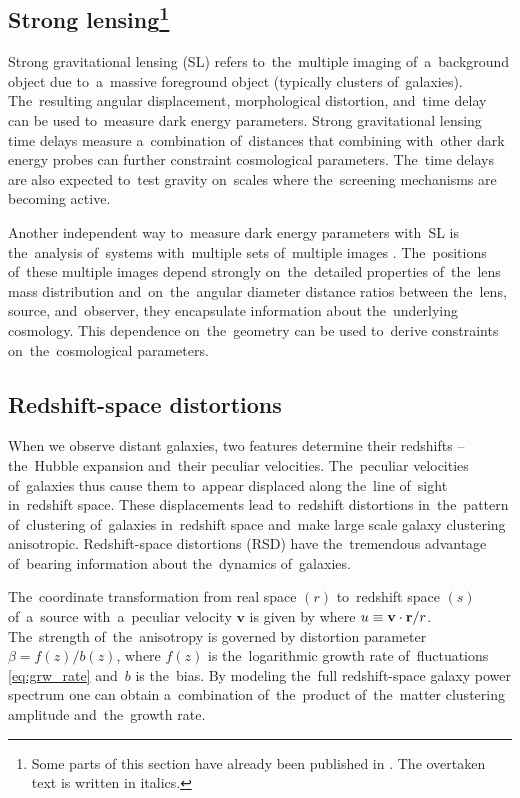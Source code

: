 \subsection[Strong lensing]{Strong lensing\footnote{\label{ftn2}Some parts of this section have already been published in \textcite{mastersthesis_vrastil}. The overtaken text is written in italics.}}
\label{ssec:SL}
Strong gravitational lensing (SL) refers to~the~multiple imaging of~a~background object due to~a~massive foreground object (typically clusters of~galaxies). The~resulting angular displacement, morphological distortion, and~time delay can be used to~measure dark energy parameters. Strong gravitational lensing time delays measure a~combination of~distances that combining with~other dark energy probes can further constraint cosmological parameters. The~time delays are also expected to~test gravity on~scales where the~screening mechanisms are becoming active.

Another independent way to~measure dark energy parameters with~SL is the~analysis of~systems with~multiple sets of~multiple images \textcite{SL_in_CLGs}. The~positions of~these multiple images depend strongly on~the~detailed properties of~the~lens mass distribution and~on~the~angular diameter distance ratios between the~lens, source, and~observer, they encapsulate information about the~underlying cosmology. This dependence on~the~geometry can be used to~derive constraints on~the~cosmological parameters.
\subsection[Redshift-space distortions]{Redshift-space distortions}
\label{sec:rsd}
When we observe distant galaxies, two features determine their redshifts -- the~Hubble expansion and~their peculiar velocities. The~peculiar velocities of~galaxies thus cause them to~appear displaced along the~line of~sight in~redshift space. These displacements lead to~redshift distortions in~the~pattern of~clustering of~galaxies in~redshift space and~make large scale galaxy clustering anisotropic. Redshift-space distortions (RSD) have the~tremendous advantage of~bearing information about the~dynamics of~galaxies.

The~coordinate transformation from real space $(r)$ to~redshift space $(s)$ of~a~source with~a~peculiar velocity $\bm v$ is given by \parencite{2010deto.book.....A}
where $u\equiv\mathbf v\cdot\mathbf r/r$. The~strength of~the~anisotropy is governed by distortion parameter $\beta = f(z)/b(z)$, where $f(z)$ is the~logarithmic growth rate of~fluctuations \eqref{eq:grw_rate} and~$b$ is the~bias. By modeling the~full redshift-space galaxy power spectrum one can obtain a~combination of~the~product of~the~matter clustering amplitude and~the~growth rate.

